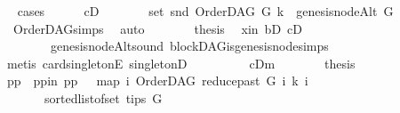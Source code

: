 \begin{isabellebody}
\ \ \isamarkupfalse%
{\isacharparenleft}{\kern0pt}cases{\isacharparenright}{\kern0pt}\isanewline
\ \ \ \ \isamarkupfalse%
\ {\isacharparenleft}{\kern0pt}cD{}{\isacharparenright}{\kern0pt}\isanewline
\ \ \ \ \isamarkupfalse%
\ \isamarkupfalse%
\ {\isachardoublequoteopen}set\ {\isacharparenleft}{\kern0pt}snd\ {\isacharparenleft}{\kern0pt}OrderDAG\ G\ k{\isacharparenright}{\kern0pt}{\isacharparenright}{\kern0pt}\ {\isacharequal}{\kern0pt}\ {\isacharbraceleft}{\kern0pt}genesis{\isacharunderscore}{\kern0pt}nodeAlt\ G{\isacharbraceright}{\kern0pt}{\isachardoublequoteclose}\ \isanewline
\ \ \ \ \ \ \isamarkupfalse%
\ {}\ OrderDAG{\isachardot}{\kern0pt}simps\ \isamarkupfalse%
\ auto\isanewline
\ \ \ \ \isamarkupfalse%
\ \isamarkupfalse%
\ {\isacharquery}{\kern0pt}thesis\ \isamarkupfalse%
\ x{\isacharunderscore}{\kern0pt}in\ bD\ cD{}\isanewline
\ \ \ \ \ \ \ \ genesis{\isacharunderscore}{\kern0pt}nodeAlt{\isacharunderscore}{\kern0pt}sound\ blockDAG{\isachardot}{\kern0pt}is{\isacharunderscore}{\kern0pt}genesis{\isacharunderscore}{\kern0pt}node{\isachardot}{\kern0pt}simps\isanewline
\ \ \ \ \ \ \isamarkupfalse%
\ {}\isanewline
\ \ \ \ \ \ \isamarkupfalse%
\ {\isacharparenleft}{\kern0pt}metis\ card{\isacharunderscore}{\kern0pt}{}{\isacharunderscore}{\kern0pt}singletonE\ singletonD{\isacharparenright}{\kern0pt}\ \isanewline
\ \ \isamarkupfalse%
\isanewline
\ \ \ \ \isamarkupfalse%
\ {\isacharparenleft}{\kern0pt}cDm{\isacharparenright}{\kern0pt}\isanewline
\ \ \ \ \isamarkupfalse%
\ \isamarkupfalse%
\ {\isacharquery}{\kern0pt}thesis\isanewline
\ \ \ \ \isamarkupfalse%
\ {\isacharminus}{\kern0pt}\isanewline
\ \ \ \ \ \ \isamarkupfalse%
\ pp\ \ pp{\isacharunderscore}{\kern0pt}in{\isacharcolon}{\kern0pt}\ {\isachardoublequoteopen}pp\ {\isacharequal}{\kern0pt}\ \ {\isacharparenleft}{\kern0pt}map\ {\isacharparenleft}{\kern0pt}{\isasymlambda}i{\isachardot}{\kern0pt}\ {\isacharparenleft}{\kern0pt}OrderDAG\ {\isacharparenleft}{\kern0pt}reduce{\isacharunderscore}{\kern0pt}past\ G\ i{\isacharparenright}{\kern0pt}\ k{\isacharcomma}{\kern0pt}\ i{\isacharparenright}{\kern0pt}{\isacharparenright}{\kern0pt}\isanewline
\ \ \ \ \ \ \ {\isacharparenleft}{\kern0pt}sorted{\isacharunderscore}{\kern0pt}list{\isacharunderscore}{\kern0pt}of{\isacharunderscore}{\kern0pt}set\ {\isacharparenleft}{\kern0pt}tips\ G{\isacharparenright}{\kern0pt}{\isacharparenright}{\kern0pt}{\isacharparenright}{\kern0pt}{\isachardoublequoteclose}\ \isamarkupfalse%

\end{isabellebody}
